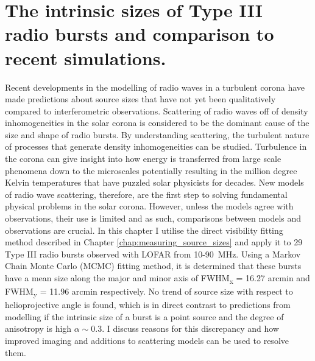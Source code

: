 \doublespacing
\chapter{The intrinsic sizes of Type III radio bursts and comparison to recent simulations.}
\label{chap:observations_vs_theory}
Recent developments in the modelling of radio waves in a turbulent corona have made predictions about source sizes that have not yet been qualitatively compared to interferometric observations. Scattering of radio waves off of density inhomogeneities in the solar corona is considered to be the dominant cause of the size and shape of radio bursts. By understanding scattering, the turbulent nature of processes that generate density inhomogeneities can be studied. Turbulence in the corona can give insight into how energy is transferred from large scale phenomena down to the microscales potentially resulting in the million degree Kelvin temperatures that have puzzled solar physicists for decades. New models of radio wave scattering, therefore, are the first step to solving fundamental physical problems in the solar corona. However, unless the models agree with observations, their use is limited and as such, comparisons between models and observations are crucial. In this chapter I utilise the direct visibility fitting method described in Chapter \ref{chap:measuring_source_sizes} and apply it to 29 Type III radio bursts observed with LOFAR from 10-90~MHz. Using a Markov Chain Monte Carlo (MCMC) fitting method, it is determined that these bursts have a mean size along the major and minor axis of FWHM\textsubscript{x} = 16.27 arcmin and FWHM\textsubscript{y} = 11.96 arcmin respectively. No trend of source size with respect to helioprojective angle is found, which is in direct contrast to predictions from modelling if the intrinsic size of a burst is a point source and the degree of anisotropy is high $\alpha \sim 0.3$. I discuss reasons for this discrepancy and how improved imaging and additions to scattering models can be used to resolve them.

